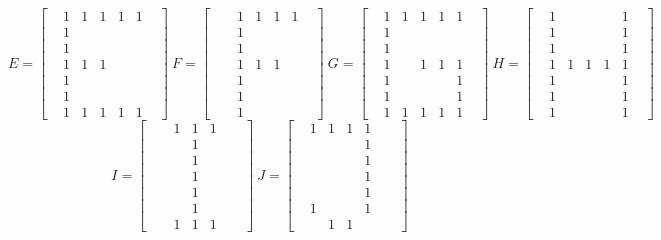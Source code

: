 \documentclass{article}
\begin{document}
	\[
	E = 
	\begin{bmatrix}
	&1&1&1&1&1&\\
	&1&&&&&\\
	&1&&&&&\\
	&1&1&1&&&\\
	&1&&&&&\\
	&1&&&&&\\
	&1&1&1&1&1&
	\end{bmatrix}
	~F = 
	\begin{bmatrix}
	&&1&1&1&1&\\
	&&1&&&&\\
	&&1&&&&\\
	&&1&1&1&&\\
	&&1&&&&\\
	&&1&&&&\\
	&&1&&&&
	\end{bmatrix}
	~G = 
	\begin{bmatrix}
	&1&1&1&1&1&\\
	&1&&&&&\\
	&1&&&&&\\
	&1&&1&1&1&\\
	&1&&&&1&\\
	&1&&&&1&\\
	&1&1&1&1&1&
	\end{bmatrix}
	~H = 
	\begin{bmatrix}
	&1&&&&1&\\
	&1&&&&1&\\
	&1&&&&1&\\
	&1&1&1&1&1&\\
	&1&&&&1&\\
	&1&&&&1&\\
	&1&&&&1&
	\end{bmatrix}
	\]
	\[
	I = 
	\begin{bmatrix}
	&&1&1&1&&\\
	&&&1&&&\\
	&&&1&&&\\
	&&&1&&&\\
	&&&1&&&\\
	&&&1&&&\\
	&&1&1&1&&
	\end{bmatrix}
	~J = 
	\begin{bmatrix}
	&1&1&1&1&&\\
	&&&&1&&\\
	&&&&1&&\\
	&&&&1&&\\
	&&&&1&&\\
	&1&&&1&&\\
	&&1&1&&&
	\end{bmatrix}
	\]

		
\end{document}
